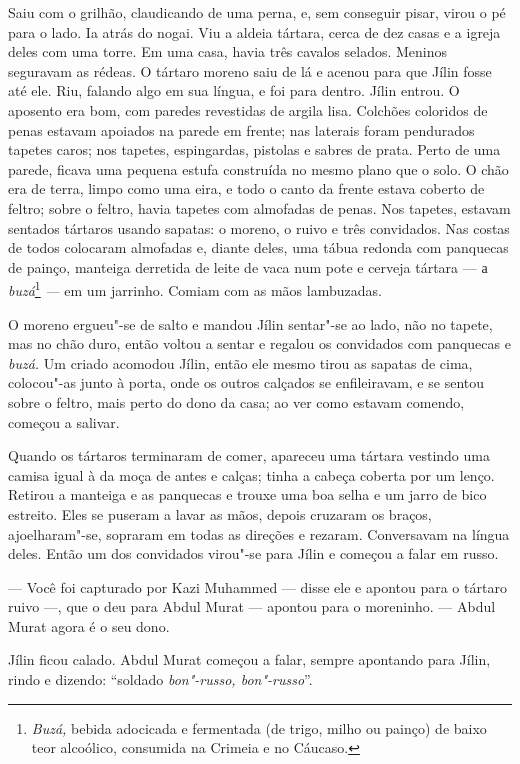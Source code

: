 Saiu com o grilhão, claudicando de uma perna, e, sem conseguir pisar,
virou o pé para o lado. Ia atrás do nogai. Viu a aldeia tártara, cerca
de dez casas e a igreja deles com uma torre. Em uma casa, havia três
cavalos selados. Meninos seguravam as rédeas. O tártaro moreno saiu de
lá e acenou para que Jílin fosse até ele. Riu, falando algo em sua
língua, e foi para dentro. Jílin entrou. O aposento era bom, com paredes
revestidas de argila lisa. Colchões coloridos de penas estavam apoiados
na parede em frente; nas laterais foram pendurados tapetes caros; nos
tapetes, espingardas, pistolas e sabres de prata. Perto de uma parede,
ficava uma pequena estufa construída no mesmo plano que o solo. O chão
era de terra, limpo como uma eira, e todo o canto da frente estava
coberto de feltro; sobre o feltro, havia tapetes com almofadas de penas.
Nos tapetes, estavam sentados tártaros usando sapatas: o moreno, o ruivo
e três convidados. Nas costas de todos colocaram almofadas e, diante
deles, uma tábua redonda com panquecas de painço, manteiga derretida de
leite de vaca num pote e cerveja tártara --- а \emph{buzá}\footnote{\emph{Buzá,}
  bebida adocicada e fermentada (de trigo, milho ou painço) de baixo
  teor alcoólico, consumida na Crimeia e no Cáucaso.} \emph{---} em um
jarrinho. Comiam com as mãos lambuzadas.

O moreno ergueu"-se de salto e mandou Jílin sentar"-se ao lado, não no
tapete, mas no chão duro, então voltou a sentar e regalou os convidados
com panquecas e \emph{buzá.} Um criado acomodou Jílin, então ele mesmo
tirou as sapatas de cima, colocou"-as junto à porta, onde os outros
calçados se enfileiravam, e se sentou sobre o feltro, mais perto do dono
da casa; ao ver como estavam comendo, começou a salivar.

Quando os tártaros terminaram de comer, apareceu uma tártara vestindo
uma camisa igual à da moça de antes e calças; tinha a cabeça coberta por
um lenço. Retirou a manteiga e as panquecas e trouxe uma boa selha e um
jarro de bico estreito. Eles se puseram a lavar as mãos, depois cruzaram
os braços, ajoelharam"-se, sopraram em todas as direções e rezaram.
Conversavam na língua deles. Então um dos convidados virou"-se para Jílin
e começou a falar em russo.

--- Você foi capturado por Kazi Muhammed --- disse ele e apontou para o
tártaro ruivo ---, que o deu para Abdul Murat --- apontou para o
moreninho. --- Abdul Murat agora é o seu dono.

Jílin ficou calado. Abdul Murat começou a falar, sempre apontando para
Jílin, rindo e dizendo: ``soldado \emph{bon"-russo, bon"-russo}''.

